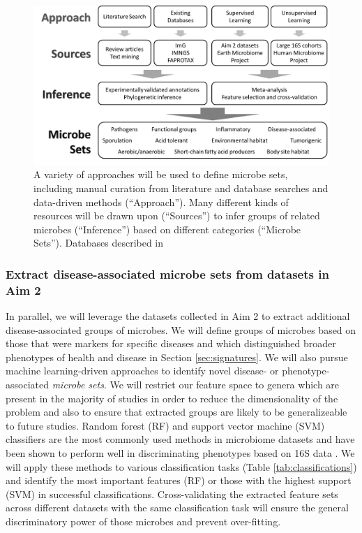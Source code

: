 \documentclass[12pt]{article}
\begin{document}
\begin{figure}
\begin{center}
	\includegraphics[scale=0.5]{microbe_sets}
	\caption{A variety of approaches will be used to define
	microbe sets, including manual curation from literature
	and database searches and data-driven methods (``Approach'').
	Many different kinds of resources will be drawn upon 
	(``Sources'') to infer groups of related microbes 
	(``Inference'') based on different categories 
	(``Microbe Sets''). Databases described in \cite{markowitz-img-2013, louca-faprotax-2016, lagkouvardos-imngs-2016}}
	\label{fig:microbe_sets}
\end{center}
\end{figure}

\subsubsection{Extract disease-associated microbe sets from datasets in Aim 2}
In parallel, we will leverage the datasets collected in Aim 2 to extract additional 
disease-associated groups of microbes. We will define groups of 
microbes based on those that were markers for specific diseases and which
distinguished broader phenotypes of health and disease in Section \ref{sec:signatures}. 
We will also pursue machine learning-driven approaches to identify novel disease- or 
phenotype-associated \textit{microbe sets}. We will restrict our feature space
to genera which are present in the majority of studies in order to reduce the
dimensionality of the problem and also to ensure that extracted groups
are likely to be generalizeable to future studies. Random forest (RF) and support
vector machine (SVM) classifiers are the most commonly used methods in
microbiome datasets and have been shown to perform well in discriminating
phenotypes based on 16S data \cite{ibd-papa, knights-supervised-2010, pasolli-meta_analysis-2016}. We will apply these methods to various classification tasks (Table \ref{tab:classifications})
and identify the most important features (RF) or those with the highest support (SVM)
in successful classifications.
Cross-validating the extracted feature sets across different datasets with the same
classification task will ensure the general discriminatory 
power of those microbes and prevent over-fitting.
\end{document}
